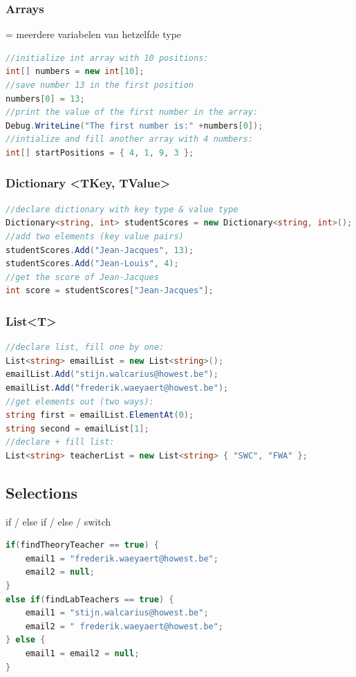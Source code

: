 \documentclass{article}
\begin{document}
\subsubsection{Arrays}
= meerdere variabelen van hetzelfde type

\begin{lstlisting}[language=csharp]
//initialize int array with 10 positions:
int[] numbers = new int[10];
//save number 13 in the first position
numbers[0] = 13;
//print the value of the first number in the array:
Debug.WriteLine("The first number is:" +numbers[0]);
//intialize and fill another array with 4 numbers:
int[] startPositions = { 4, 1, 9, 3 };
\end{lstlisting}

\subsubsection{Dictionary <TKey, TValue>}

\begin{lstlisting}[language=csharp]
//declare dictionary with key type & value type
Dictionary<string, int> studentScores = new Dictionary<string, int>();
//add two elements (key value pairs)
studentScores.Add("Jean-Jacques", 13);
studentScores.Add("Jean-Louis", 4);
//get the score of Jean-Jacques
int score = studentScores["Jean-Jacques"];
\end{lstlisting}


\subsubsection{List<T>}

\begin{lstlisting}[language=csharp]
//declare list, fill one by one:
List<string> emailList = new List<string>();
emailList.Add("stijn.walcarius@howest.be");
emailList.Add("frederik.waeyaert@howest.be");
//get elements out (two ways):
string first = emailList.ElementAt(0);
string second = emailList[1];
//declare + fill list:
List<string> teacherList = new List<string> { "SWC", "FWA" };
\end{lstlisting}

\subsection{Selections}
if / else if / else / switch

\begin{lstlisting}[language=csharp]
if(findTheoryTeacher == true) {
    email1 = "frederik.waeyaert@howest.be";
    email2 = null;
}
else if(findLabTeachers == true) {
    email1 = "stijn.walcarius@howest.be";
    email2 = " frederik.waeyaert@howest.be";
} else {
    email1 = email2 = null;
}
\end{lstlisting}
\end{document}
